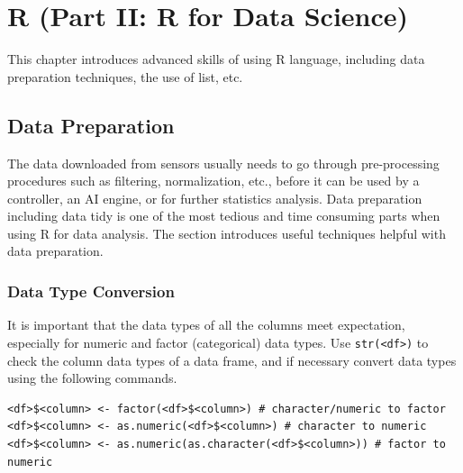 \chapter{R (Part II: R for Data Science)} \label{ch:r2}

This chapter introduces advanced skills of using R language, including data preparation techniques, the use of list, etc.

\section{Data Preparation} \label{ch:r2:sec:datapreparation}

The data downloaded from sensors usually needs to go through pre-processing procedures such as filtering, normalization, etc., before it can be used by a controller, an AI engine, or for further statistics analysis. Data preparation including data tidy is one of the most tedious and time consuming parts when using R for data analysis. The section introduces useful techniques helpful with data preparation.

\subsection{Data Type Conversion}

It is important that the data types of all the columns meet expectation, especially for numeric and factor (categorical) data types. Use \verb|str(<df>)| to check the column data types of a data frame, and if necessary convert data types using the following commands.
\begin{lstlisting}
<df>$<column> <- factor(<df>$<column>) # character/numeric to factor
<df>$<column> <- as.numeric(<df>$<column>) # character to numeric
<df>$<column> <- as.numeric(as.character(<df>$<column>)) # factor to numeric
\end{lstlisting}


